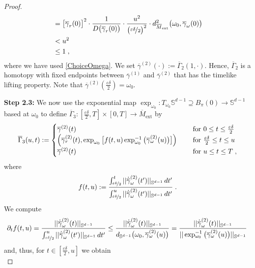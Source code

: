 \documentclass[reqno]{article}
\newcommand{\Sd}{\mathbb{S}^{d-1}}
\newcommand{\ovg}{\overline{\gamma}}
\newcommand{\oMe}{\overline{M}_\mathrm{ext}}
\begin{document}
\begin{proof}
\begin{equation*}
\begin{split}
&=  \big[\ovg_r(0)\big]^2 \cdot \frac{1}{D\big( \ovg_r(0)\big)} \cdot \frac{u^2}{\big(\nicefrac{\varepsilon \delta}{2}\big)^2} \cdot   d^2_{\oMe}\big( \omega_0, \ovg_\omega(0)\big) \\
&< u^2 \\
&\leq 1 \;,
\end{split}
\end{equation*}
where we have used \eqref{ChoiceOmega}. We set $\ovg^{(2)}(\cdot) := \overline{\Gamma}_2(1, \cdot)$. Hence, $\overline{\Gamma}_2$ is a homotopy with fixed endpoints between $\ovg^{(1)}$ and $\ovg^{(2)}$ that has the timelike lifting property. Note that $\ovg^{(2)}(\frac{\varepsilon \delta}{2}) = \omega_0$.
\vspace*{2mm}

\textbf{Step 2.3:} We now use the exponential map $\exp_{\omega_0} : T_{\omega_0} \Sd \supseteq B_\pi(0) \to \Sd$ based at $\omega_0$ to define $\overline{\Gamma}_3 : [ \frac{\varepsilon \delta }{2} , T] \times [0, T] \to \oMe$ by
\begin{equation*}
\overline{\Gamma}_3(u,t) := \begin{cases} \ovg^{(2)}(t) &\textnormal{ for } 0 \leq t \leq \frac{\varepsilon \delta}{2} \\
\Big(\ovg_r^{(2)}(t), \exp_{\omega_0} \big[f(t,u) \exp^{-1}_{\omega_0}\big(\ovg^{(2)}_\omega(u)\big)\big] \Big) \quad &\textnormal{ for } \frac{\varepsilon \delta}{2} \leq t \leq u \\
\ovg^{(2)}(t) &\textnormal{ for } u \leq t \leq T \;,
\end{cases}
\end{equation*}
where
\begin{equation*}
f(t,u) := \frac{\int_{\nicefrac{\varepsilon \delta}{2}}^t || \dot{\ovg}^{(2)}_\omega(t')||_{\Sd} \, dt'}{\int_{\nicefrac{\varepsilon \delta}{2}}^u || \dot{\ovg}^{(2)}_\omega(t') ||_{\Sd} \, dt' } \;.
\end{equation*}
We compute
\begin{equation*}
\partial_t f(t,u) = \frac{|| \dot{\ovg}^{(2)}_\omega(t)||_{\Sd}}{\int_{\nicefrac{\varepsilon \delta}{2}}^u || \dot{\ovg}^{(2)}_\omega(t') ||_{\Sd} \, dt' } \leq \frac{|| \dot{\ovg}^{(2)}_\omega(t)||_{\Sd}}{d_{\Sd}\big(\omega_0, \ovg^{(2)}_\omega(u)\big)} = \frac{|| \dot{\ovg}^{(2)}_\omega(t)||_{\Sd}}{||\exp^{-1}_{\omega_0}\big( \ovg^{(2)}_\omega(u)\big)||_{\Sd}}\,
\end{equation*}
and, thus, for $t \in [\frac{\varepsilon \delta}{2}, u]$ we obtain
\begin{equation*}

\end{equation*}
\end{proof}
\end{document}
